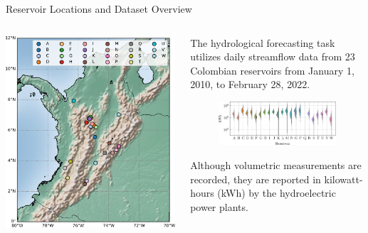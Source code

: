 \begin{frame}{Reservoir Locations and Dataset Overview}
	\begin{columns}[T] %
		\begin{column}{0.45\textwidth}
			\includegraphics[width=\linewidth]{images/colombiamap.pdf}
		
		\end{column}
		\begin{column}{0.55\textwidth}
			\justifying %
			\begin{block}{}
			The hydrological forecasting task utilizes daily streamflow data from 23 Colombian reservoirs from January 1, 2010, to February 28, 2022.
			\end{block}
			\begin{figure}[htbp]
				\centering
				\includegraphics[width=\textwidth]{images/ct_violinplot.pdf}
			\end{figure}
			\begin{block}{}
			Although volumetric measurements are recorded, they are reported in kilowatt-hours (kWh) by the hydroelectric power plants.
			\end{block}
		\end{column}
	\end{columns}
\end{frame}

